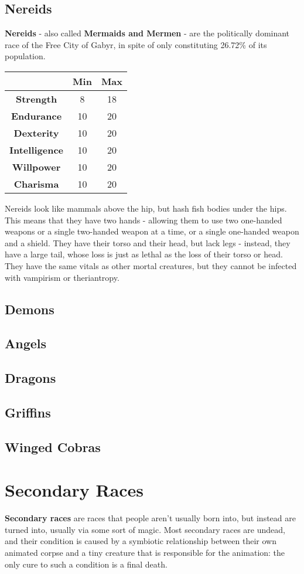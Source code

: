 \documentclass[openany,10pt,a4paper]{book}
\begin{document}
\section{Nereids}
\textbf{Nereids} - also called \textbf{Mermaids and Mermen} - are the politically dominant race of the Free City of Gabyr, in spite of only constituting 26.72\% of its population.\newline
\begin{tabular}{|c|c|c|}
\hline
 & \textbf{Min} & \textbf{Max} \\ \hline
\textbf{Strength} & 8 & 18 \\ \hline
\textbf{Endurance} & 10 & 20 \\ \hline
\textbf{Dexterity} & 10 & 20 \\ \hline
\textbf{Intelligence} & 10 & 20 \\ \hline
\textbf{Willpower} & 10 & 20 \\ \hline
\textbf{Charisma} & 10 & 20 \\ \hline
\end{tabular}\newline
Nereids look like mammals above the hip, but hash fish bodies under the hips. This means that they have two hands - allowing them to use two one-handed weapons or a single two-handed weapon at a time, or a single one-handed weapon and a shield. They have their torso and their head, but lack legs - instead, they have a large tail, whose loss is just as lethal as the loss of their torso or head. They have the same vitals as other mortal creatures, but they cannot be infected with vampirism or theriantropy.\newpage
\section{Demons}
\section{Angels}
\section{Dragons}
\section{Griffins}
\section{Winged Cobras}
\chapter{Secondary Races}
\textbf{Secondary races} are races that people aren't usually born into, but instead are turned into, usually via some sort of magic. Most secondary races are undead, and their condition is caused by a symbiotic relationship between their own animated corpse and a tiny creature that is responsible for the animation: the only cure to such a condition is a final death.
\end{document}
